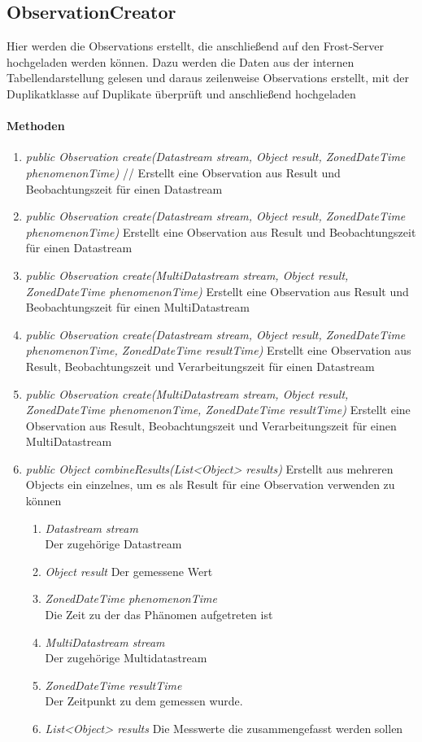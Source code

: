 
\subsection{ObservationCreator}


Hier werden die Observations erstellt, die anschließend auf den Frost-Server hochgeladen werden können.
Dazu werden die Daten aus der internen Tabellendarstellung gelesen und daraus zeilenweise Observations erstellt, mit der Duplikatklasse auf Duplikate überprüft und anschließend hochgeladen

\paragraph{Methoden}

\begin{enumerate}[+]
	\item \textit{public Observation create(Datastream stream, Object result, ZonedDateTime phenomenonTime)} // Erstellt eine Observation aus Result und Beobachtungszeit für einen Datastream
	\item \textit{public Observation create(Datastream stream, Object result, ZonedDateTime phenomenonTime)} Erstellt eine Observation aus Result und Beobachtungszeit für einen Datastream
	\item \textit{public Observation create(MultiDatastream stream, Object result, ZonedDateTime phenomenonTime)} Erstellt eine Observation aus Result und Beobachtungszeit für einen MultiDatastream
	\item \textit{public Observation create(Datastream stream, Object result, ZonedDateTime phenomenonTime, ZonedDateTime resultTime)} Erstellt eine Observation aus Result, Beobachtungszeit und Verarbeitungszeit für einen Datastream
	\item \textit{public Observation create(MultiDatastream stream, Object result, ZonedDateTime phenomenonTime, ZonedDateTime resultTime)} Erstellt eine Observation aus Result, Beobachtungszeit und Verarbeitungszeit für einen MultiDatastream
	\item \textit{public Object combineResults(List<Object> results)} Erstellt aus mehreren Objects ein einzelnes, um es als Result für eine Observation verwenden zu können
	
	\begin{enumerate}[$\bullet$]
		\item \textit{Datastream stream} \\Der zugehörige Datastream
		\item \textit{Object result} Der gemessene Wert
		\item \textit{ZonedDateTime phenomenonTime} \\Die Zeit zu der das Phänomen aufgetreten ist
		\item \textit{MultiDatastream stream} \\ Der zugehörige Multidatastream
		\item \textit{ZonedDateTime resultTime} \\ Der Zeitpunkt zu dem gemessen wurde.
		\item \textit{List<Object> results} Die Messwerte die zusammengefasst werden sollen
	\end{enumerate}
\end{enumerate}